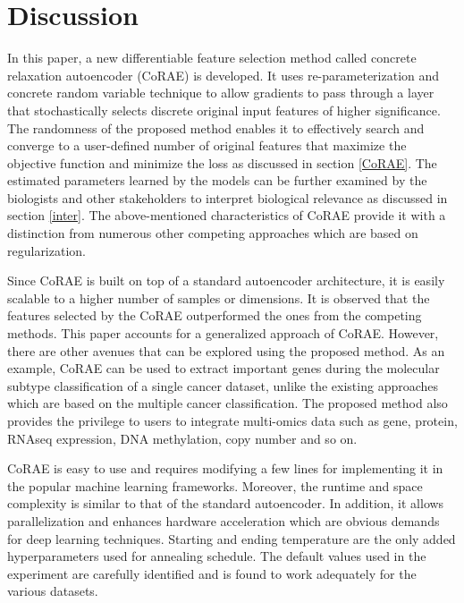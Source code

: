 \documentclass{bioinfo}
\begin{document}
\section{Discussion}
In this paper, a new differentiable feature selection method called concrete relaxation autoencoder (CoRAE) is developed.
It uses re-parameterization and concrete random variable technique to allow gradients to pass through a layer that stochastically selects discrete original input features of higher significance.
The randomness of the proposed method enables it to effectively search and converge to a user-defined number of original features that maximize the objective function and minimize the loss as discussed in section \ref{CoRAE}.
The estimated parameters learned by the models can be further examined by the biologists and other stakeholders to interpret biological relevance as discussed in section \ref{inter}.
The above-mentioned characteristics of CoRAE provide it with a distinction from numerous other competing approaches which are based on regularization. 

Since CoRAE is built on top of a standard autoencoder architecture, it is easily scalable to a higher number of samples or dimensions.
It is observed that the features selected by the CoRAE outperformed the ones from the competing methods.
This paper accounts for a generalized approach of CoRAE. However, there are other avenues that can be explored using the proposed method.
As an example, CoRAE can be used to extract important genes during the molecular subtype classification of a single cancer dataset, unlike the existing approaches which are based on the multiple cancer classification.
The proposed method also provides the privilege to users to integrate multi-omics data such as gene, protein, RNAseq expression, DNA methylation, copy number and so on. 

CoRAE is easy to use and requires modifying a few lines for implementing it in the popular machine learning frameworks.
Moreover, the runtime and space complexity is similar to that of the standard autoencoder.
In addition, it allows parallelization and enhances hardware acceleration which are obvious demands for deep learning techniques.
Starting and ending temperature are the only added hyperparameters used for annealing schedule.
The default values used in the experiment are carefully identified and is found to work adequately for the various datasets.
\end{document}
